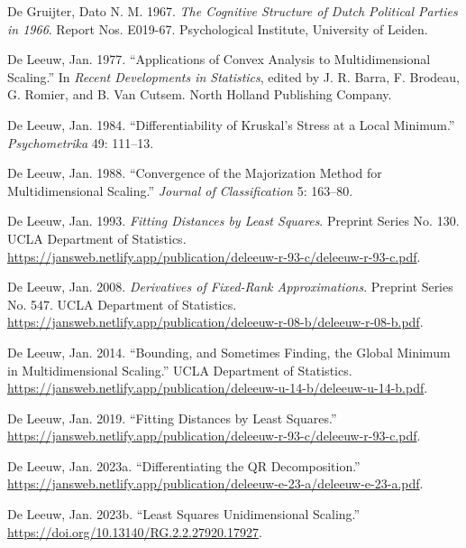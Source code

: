 \documentclass[
  12pt,
  letterpaper,
  DIV=11,
  numbers=noendperiod]{scrartcl}
\newlength{\cslhangindent}
\newenvironment{CSLReferences}[2] %
 {\begin{list}{}{%
  \setlength{\itemindent}{0pt}
  \setlength{\leftmargin}{0pt}
  \setlength{\parsep}{0pt}
  \ifodd #1
   \setlength{\leftmargin}{\cslhangindent}
   \setlength{\itemindent}{-1\cslhangindent}
  \fi
  \setlength{\itemsep}{#2\baselineskip}}}
 {\end{list}}
\begin{document}
\protect{}\label{refs}
\begin{CSLReferences}{1}{1}
De Gruijter, Dato N. M. 1967. \emph{{The Cognitive Structure of Dutch
Political Parties in 1966}}. Report Nos. E019-67. Psychological
Institute, University of Leiden.

De Leeuw, Jan. 1977. {``Applications of Convex Analysis to
Multidimensional Scaling.''} In \emph{Recent Developments in
Statistics}, edited by J. R. Barra, F. Brodeau, G. Romier, and B. Van
Cutsem. North Holland Publishing Company.

De Leeuw, Jan. 1984. {``{Differentiability of Kruskal's Stress at a
Local Minimum}.''} \emph{Psychometrika} 49: 111--13.

De Leeuw, Jan. 1988. {``Convergence of the Majorization Method for
Multidimensional Scaling.''} \emph{Journal of Classification} 5:
163--80.

De Leeuw, Jan. 1993. \emph{Fitting Distances by Least Squares}. Preprint
Series No. 130. UCLA Department of Statistics.
\url{https://jansweb.netlify.app/publication/deleeuw-r-93-c/deleeuw-r-93-c.pdf}.

De Leeuw, Jan. 2008. \emph{{Derivatives of Fixed-Rank Approximations}}.
Preprint Series No. 547. UCLA Department of Statistics.
\url{https://jansweb.netlify.app/publication/deleeuw-r-08-b/deleeuw-r-08-b.pdf}.

De Leeuw, Jan. 2014. {``{Bounding, and Sometimes Finding, the Global
Minimum in Multidimensional Scaling}.''} UCLA Department of Statistics.
\url{https://jansweb.netlify.app/publication/deleeuw-u-14-b/deleeuw-u-14-b.pdf}.

De Leeuw, Jan. 2019. {``{Fitting Distances by Least Squares}.''}
\url{https://jansweb.netlify.app/publication/deleeuw-r-93-c/deleeuw-r-93-c.pdf}.

De Leeuw, Jan. 2023a. {``Differentiating the QR Decomposition.''}
\url{https://jansweb.netlify.app/publication/deleeuw-e-23-a/deleeuw-e-23-a.pdf}.

De Leeuw, Jan. 2023b. {``Least Squares Unidimensional Scaling.''}
\url{https://doi.org/10.13140/RG.2.2.27920.17927}.


\end{CSLReferences}
\end{document}

